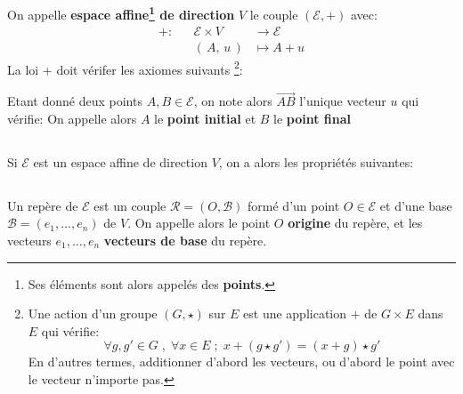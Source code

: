 \subsection*{}
On appelle \textbf{espace affine\footnote[1]{Ses éléments sont alors appelés des \textbf{points}.} de direction} \(V\) le couple \((\mathscr{E}, +)\) avec:
\[
   \begin{aligned}
      + : &&\mathscr{E} \times V &\longrightarrow \mathscr{E}\\
      &&(\,A, \, u\,) &\longmapsto A + u
   \end{aligned}
\]
La loi + doit vérifer les axiomes suivants 
\footnote[2]{Une action d'un groupe \((G, \star)\) sur \(E\) est une application \(+\) de \(G \times E \) dans \(E\) qui vérifie: \[
   \forall g, g' \in G  \; , \; \forall x \in E \; ; \; x + (g \star g') = (x + g) \star g'
\] \hspace{15pt} En d'autres termes, additionner d'abord les vecteurs, ou d'abord le point avec le vecteur n'importe pas.}:

Etant donné deux points \(A, B \in \mathscr{E}\), on note alors \(\overrightarrow{AB}\) l'unique vecteur \(u\) qui vérifie:
On appelle alors \(A\) le \textbf{point initial} et \(B\) le \textbf{point final}
\subsection*{}
Si \(\mathscr{E}\) est un espace affine de direction \(V\), on a alors les propriétés suivantes:
\subsection*{}
Un repère de \(\mathscr{E}\) est un couple \(\mathscr{R} = (O, \mathscr{B})\) formé d'un point \(O \in \mathscr{E}\) et d'une base \(\mathscr{B} = (e_1, \ldots, e_n)\) de \(V\). On appelle alors le point \(O\) \textbf{origine} du repère, et les vecteurs \(e_1, \ldots, e_n\) \textbf{vecteurs de base} du repère.\<

